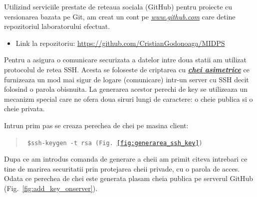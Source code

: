 \begin{flushleft} %
\end{flushleft}

Utilizind serviciile prestate de reteaua sociala (GitHub) pentru proiecte cu versionarea bazata pe Git, am creat un cont pe \emph{\url{www.github.com}} care detine repozitoriul laboratorului efectuat.

\newcommand*{\authorimg}[1]{%
	\raisebox{-.3\baselineskip}{%
		\texttt{[image: \#1]}%
	}%
}
\begin{itemize}
	\item[\authorimg{img/1.png}]
	\begin{center}
		Link la repozitoriu: \url{https://github.com/CristianGodonoaga/MIDPS}
	\end{center}
\end{itemize}


Pentru a asigura o comunicare securizata a datelor intre doua statii am utilizat protocolul de retea SSH. Acesta se foloseste de criptarea cu \emph{\textbf{\href{https://en.wikipedia.org/wiki/Public-key_cryptography}{chei asimetrice}}} ce furnizeaza un mod mai sigur de logare (comunicare) intr-un server cu SSH decit folosind o parola obisnuita. La generarea acestor perechi de key se utilizeaza un mecanizm special care ne ofera doua siruri lungi de caractere: o cheie publica si o cheie privata.

Intrun prim pas se creaza perechea de chei pe masina client:
\begin{quote}\tt
	\$ssh-keygen -t rsa \hfill (Fig.~\ref{fig:generarea_ssh_key})
\end{quote}


Dupa ce am introdus comanda de generare a cheii am primit citeva intrebari ce tine de marirea securitatii prin protejarea cheii privade, cu o parola de acces. Odata ce perechea de chei este generata plasam cheia publica pe serverul GitHub (Fig.~\ref{fig:add_key_onserver}).

